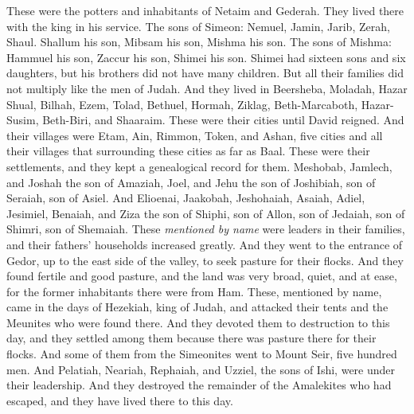 \begin{biblechapter}
\verse These were the potters and inhabitants of Netaim and Gederah. They lived there with the king in his service.
 The sons of Simeon: Nemuel, Jamin, Jarib, Zerah, Shaul.
\verse Shallum his son, Mibsam his son, Mishma his son.
\verse The sons of Mishma: Hammuel his son, Zaccur his son, Shimei his son.
\verse Shimei had sixteen sons and six daughters, but his brothers did not have many children. But all their families did not multiply like the men of Judah.
\verse And they lived in Beersheba, Moladah, Hazar Shual,
\verse Bilhah, Ezem, Tolad,
\verse Bethuel, Hormah, Ziklag,
\verse Beth-Marcaboth, Hazar-Susim, Beth-Biri, and Shaaraim. These were their cities until David reigned.
\verse And their villages were Etam, Ain, Rimmon, Token, and Ashan, five cities
\verse and all their villages that surrounding these cities as far as Baal. These were their settlements, and they kept a genealogical record for them.
\verse Meshobab, Jamlech, and Joshah the son of Amaziah,
\verse Joel, and Jehu the son of Joshibiah, son of Seraiah, son of Asiel.
\verse And Elioenai, Jaakobah, Jeshohaiah, Asaiah, Adiel, Jesimiel, Benaiah,
\verse and Ziza the son of Shiphi, son of Allon, son of Jedaiah, son of Shimri, son of Shemaiah.
\verse These \textit{mentioned by name} were leaders in their families, and their fathers’ households increased greatly.
\verse And they went to the entrance of Gedor, up to the east side of the valley, to seek pasture for their flocks.
\verse And they found fertile and good pasture, and the land was very broad, quiet, and at ease, for the former inhabitants there were from Ham.
\verse These, mentioned by name, came in the days of Hezekiah, king of Judah, and attacked their tents and the Meunites who were found there. And they devoted them to destruction to this day, and they settled among them because there was pasture there for their flocks.
\verse And some of them from the Simeonites went to Mount Seir, five hundred men. And Pelatiah, Neariah, Rephaiah, and Uzziel, the sons of Ishi, were under their leadership.
\verse And they destroyed the remainder of the Amalekites who had escaped, and they have lived there to this day.
\end{biblechapter}

